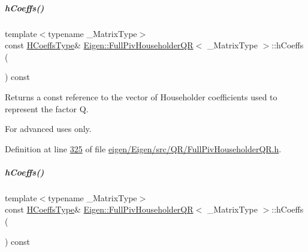\mbox{\label{group___q_r___module_a874fcd822871010f7961d9e94f1767e4}} 
\subparagraph{\texorpdfstring{h\+Coeffs()}{hCoeffs()}\hspace{0.1cm}{\footnotesize\ttfamily [1/2]}}
{\footnotesize\ttfamily template$<$typename \+\_\+\+Matrix\+Type$>$ \\
const \hyperlink{class_eigen_1_1internal_1_1_tensor_lazy_evaluator_writable}{H\+Coeffs\+Type}\& \hyperlink{group___q_r___module_class_eigen_1_1_full_piv_householder_q_r}{Eigen\+::\+Full\+Piv\+Householder\+QR}$<$ \+\_\+\+Matrix\+Type $>$\+::h\+Coeffs (\begin{DoxyParamCaption}{ }\end{DoxyParamCaption}) const\hspace{0.3cm}{\ttfamily [inline]}}

\begin{DoxyReturn}{Returns}
a const reference to the vector of Householder coefficients used to represent the factor {\ttfamily Q}.
\end{DoxyReturn}
For advanced uses only. 

Definition at line \hyperlink{eigen_2_eigen_2src_2_q_r_2_full_piv_householder_q_r_8h_source_l00325}{325} of file \hyperlink{eigen_2_eigen_2src_2_q_r_2_full_piv_householder_q_r_8h_source}{eigen/\+Eigen/src/\+Q\+R/\+Full\+Piv\+Householder\+Q\+R.\+h}.

\mbox{\label{group___q_r___module_a874fcd822871010f7961d9e94f1767e4}} 
\subparagraph{\texorpdfstring{h\+Coeffs()}{hCoeffs()}\hspace{0.1cm}{\footnotesize\ttfamily [2/2]}}
{\footnotesize\ttfamily template$<$typename \+\_\+\+Matrix\+Type$>$ \\
const \hyperlink{class_eigen_1_1internal_1_1_tensor_lazy_evaluator_writable}{H\+Coeffs\+Type}\& \hyperlink{group___q_r___module_class_eigen_1_1_full_piv_householder_q_r}{Eigen\+::\+Full\+Piv\+Householder\+QR}$<$ \+\_\+\+Matrix\+Type $>$\+::h\+Coeffs (\begin{DoxyParamCaption}{ }\end{DoxyParamCaption}) const\hspace{0.3cm}{\ttfamily [inline]}}

